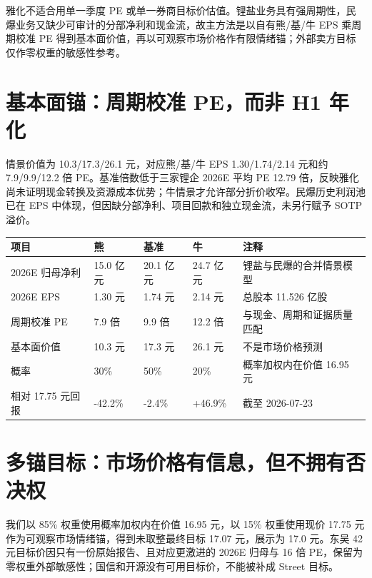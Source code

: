 雅化不适合用单一季度 PE 或单一券商目标价估值。锂盐业务具有强周期性，民爆业务又缺少可审计的分部净利和现金流，故主方法是以自有熊/基/牛 EPS 乘周期校准 PE 得到基本面价值，再以可观察市场价格作有限情绪锚；外部卖方目标仅作零权重的敏感性参考。

\section{基本面锚：周期校准 PE，而非 H1 年化}

情景价值为 10.3/17.3/26.1 元，对应熊/基/牛 EPS 1.30/1.74/2.14 元和约 7.9/9.9/12.2 倍 PE。基准倍数低于三家锂企 2026E 平均 PE 12.79 倍，反映雅化尚未证明现金转换及资源成本优势；牛情景才允许部分折价收窄。民爆历史利润池已在 EPS 中体现，但因缺分部净利、项目回款和独立现金流，未另行赋予 SOTP 溢价。

\begin{exhibitbox}[表 8-1：最终估值表]
\begin{tabularx}{\exhibitboxwidth}{L{3.1cm}R{2.2cm}R{2.2cm}R{2.2cm}X}
\toprule
项目 & 熊 & 基准 & 牛 & 注释 \\
\midrule
2026E 归母净利 & 15.0 亿元 & 20.1 亿元 & 24.7 亿元 & 锂盐与民爆的合并情景模型 \\
2026E EPS & 1.30 元 & 1.74 元 & 2.14 元 & 总股本 11.526 亿股 \\
周期校准 PE & 7.9 倍 & 9.9 倍 & 12.2 倍 & 与现金、周期和证据质量匹配 \\
基本面价值 & 10.3 元 & 17.3 元 & 26.1 元 & 不是市场价格预测 \\
概率 & 30\% & 50\% & 20\% & 概率加权内在价值 16.95 元 \\
相对 17.75 元回报 & -42.2\% & -2.4\% & +46.9\% & 截至 2026-07-23 \\
\bottomrule
\end{tabularx}
\end{exhibitbox}

\section{多锚目标：市场价格有信息，但不拥有否决权}

我们以 85\% 权重使用概率加权内在价值 16.95 元，以 15\% 权重使用现价 17.75 元作为可观察市场情绪锚，得到未取整最终目标 17.07 元，展示为 17.0 元。东吴 42 元目标价因只有一份原始报告、且对应更激进的 2026E 归母与 16 倍 PE，保留为零权重外部敏感性；国信和开源没有可用目标价，不能被补成 Street 目标。

